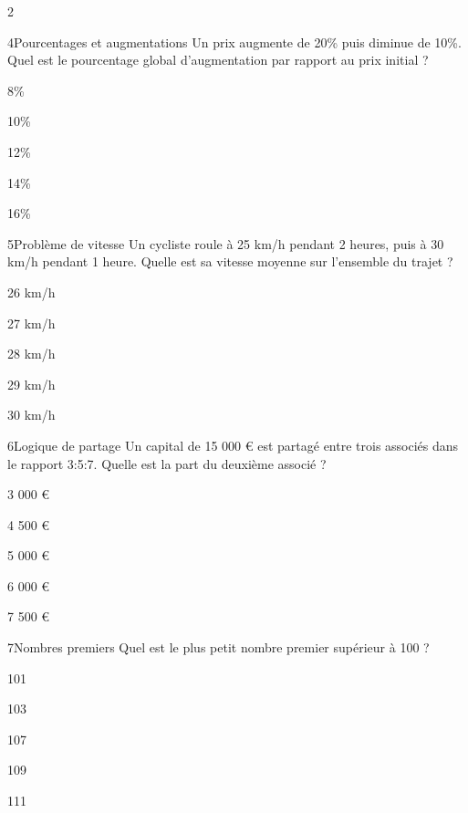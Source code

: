 \begin{multicols}{2}
\begin{question}{4}{Pourcentages et augmentations}
Un prix augmente de 20\% puis diminue de 10\%. Quel est le pourcentage global d’augmentation par rapport au prix initial ?
\begin{enumeratebf}
\item 8\%
\item 10\%
\item 12\%
\item 14\%
\item 16\%
\end{enumeratebf}
\end{question}

\begin{question}{5}{Problème de vitesse}
Un cycliste roule à 25 km/h pendant 2 heures, puis à 30 km/h pendant 1 heure. Quelle est sa vitesse moyenne sur l’ensemble du trajet ?
\begin{enumeratebf}
\item 26 km/h
\item 27 km/h
\item 28 km/h
\item 29 km/h
\item 30 km/h
\end{enumeratebf}
\end{question}

\begin{question}{6}{Logique de partage}
Un capital de 15 000 € est partagé entre trois associés dans le rapport 3:5:7. Quelle est la part du deuxième associé ?
\begin{enumeratebf}
\item 3 000 €
\item 4 500 €
\item 5 000 €
\item 6 000 €
\item 7 500 €
\end{enumeratebf}
\end{question}

\begin{question}{7}{Nombres premiers}
Quel est le plus petit nombre premier supérieur à 100 ?
\begin{enumeratebf}
\item 101
\item 103
\item 107
\item 109
\item 111
\end{enumeratebf}
\end{question}


\end{multicols}
